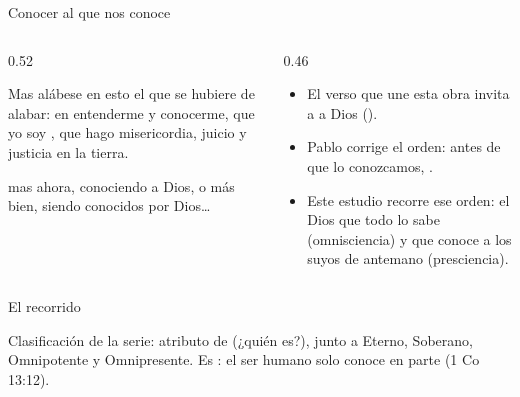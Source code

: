 \begin{frame}{Conocer al que nos conoce}
\begin{columns}[t,onlytextwidth]
\begin{column}{0.52\textwidth}
\begin{cita}Mas alábese en esto el que se hubiere de alabar: en entenderme y conocerme, que yo soy \SENOR{}, que hago misericordia, juicio y justicia en la tierra.\end{cita}
\begin{cita}mas ahora, conociendo a Dios, o más bien, siendo conocidos por Dios\ldots{}\end{cita}
\end{column}
\begin{column}{0.46\textwidth}\small
\begin{itemize}
\item El verso que une esta obra invita a  a Dios ().
\item Pablo corrige el orden: antes de que lo conozcamos, .
\item Este estudio recorre ese orden: el Dios que todo lo sabe (omnisciencia) y que conoce a los suyos de antemano (presciencia).
\end{itemize}
\end{column}
\end{columns}
\end{frame}

\begin{frame}{El recorrido}
\centering
{}\par\medskip
\small\RaggedRight Clasificación de la serie: atributo de  (¿quién es?), junto a Eterno, Soberano, Omnipotente y Omnipresente. Es : el ser humano solo conoce en parte (1 Co 13:12).
\end{frame}

